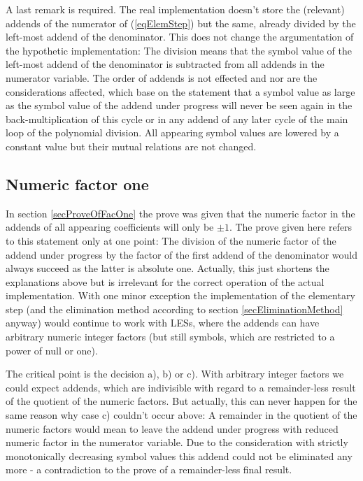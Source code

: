 A last remark is required. The real implementation doesn't store the
(relevant) addends of the numerator of (\ref{eqElemStep}) but the same,
already divided by the left-most addend of the denominator. This does not
change the argumentation of the hypothetic implementation: The division
means that the symbol value of the left-most addend of the denominator is
subtracted from all addends in the numerator variable. The order of
addends is not effected and nor are the considerations affected, which
base on the statement that a symbol value as large as the symbol value of
the addend under progress will never be seen again in the
back-multiplication of this cycle or in any addend of any later cycle of the
main loop of the polynomial division. All appearing symbol values are lowered
by a constant value but their mutual relations are not changed.


\subsection{Numeric factor one}

In section \ref{secProveOfFacOne} the prove was given that the numeric
factor in the addends of all appearing coefficients will only be $\pm 1$.
The prove given here refers to this statement only at one point: The
division of the numeric factor of the addend under progress by the factor
of the first addend of the denominator would always succeed as the latter
is absolute one. Actually, this just shortens the explanations above but
is irrelevant for the correct operation of the actual implementation. With
one minor exception the implementation of the elementary step (and the
elimination method according to section \ref{secEliminationMethod} anyway)
would continue to work with LESs, where the addends can have arbitrary numeric
integer factors (but still symbols, which are restricted to a power of
null or one).

The critical point is the decision a), b) or c). With arbitrary integer
factors we could expect addends, which are indivisible with regard to a
remainder-less result of the quotient of the numeric factors. But
actually, this can never happen for the same reason why case c) couldn't
occur above: A remainder in the quotient of the numeric factors would mean
to leave the addend under progress with reduced numeric factor in the
numerator variable. Due to the consideration with strictly monotonically
decreasing symbol values this addend could not be eliminated any more - a
contradiction to the prove of a remainder-less final result.

